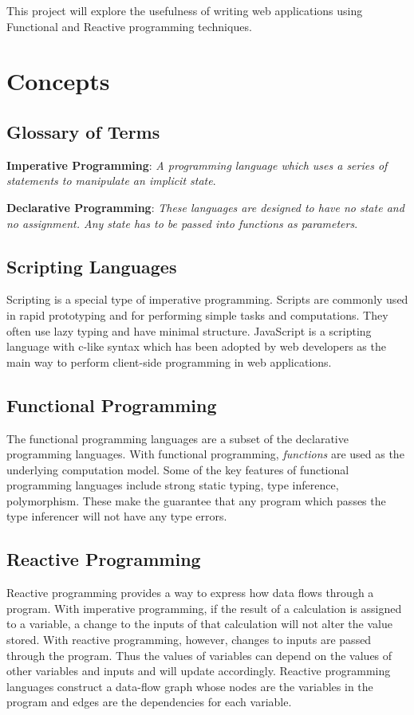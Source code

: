This project will explore the usefulness of writing web applications using Functional and Reactive programming techniques.

\section{Concepts}

\subsection{Glossary of Terms}

\textbf{Imperative Programming}: \emph{A programming language which uses a series of statements to manipulate an implicit state}.\cite{bib:prog}

\textbf{Declarative Programming}: \emph{These languages are designed to have no state and no assignment. Any state has to be passed into functions as parameters}.\cite{bib:prog}

\subsection{Scripting Languages}
Scripting is a special type of imperative programming. Scripts are commonly used in rapid prototyping and for performing simple tasks and computations. They often use lazy typing and have minimal structure. JavaScript is a scripting language with c-like syntax which has been adopted by web developers as the main way to perform client-side programming in web applications.\cite{bib:crockford}

\subsection{Functional Programming}
The functional programming languages are a subset of the declarative programming languages. With functional programming, \emph{functions} are used as the underlying computation model. Some of the key features of functional programming languages include strong static typing, type inference, polymorphism. These make the guarantee that any program which passes the type inferencer will not have any type errors.\cite{bib:functional_prog}

\subsection{Reactive Programming}
Reactive programming provides a way to express how data flows through a program. With imperative programming, if the result of a calculation is assigned to a variable, a change to the inputs of that calculation will not alter the value stored. With reactive programming, however, changes to inputs are passed through the program. Thus the values of variables can depend on the values of other variables and inputs and will update accordingly. Reactive programming languages construct a data-flow graph whose nodes are the variables in the program and edges are the dependencies for each variable.\cite{bib:functional_react,bib:lowering}

